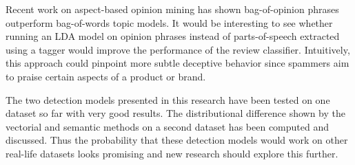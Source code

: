Recent work on aspect-based opinion mining has shown bag-of-opinion phrases outperform bag-of-words topic models. It would be interesting to see whether running an LDA model on opinion phrases instead of parts-of-speech extracted using a tagger would improve the performance of the review classifier. Intuitively, this approach could pinpoint more subtle deceptive behavior since spammers aim to praise certain aspects of a product or brand.

The two detection models presented in this research have been tested on one dataset so far with very good results. The distributional difference shown by the vectorial and semantic methods on a second dataset has been computed and discussed. Thus the probability that these detection models would work on other real-life datasets looks promising and new research should explore this further.